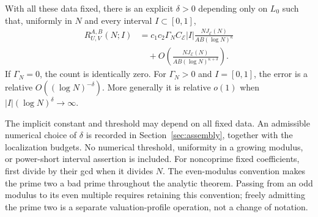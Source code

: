 \begin{theorem}\label{thm:general}
With all these data fixed, there is an explicit \(\delta>0\)
depending only on \(L_0\) such that, uniformly in \(N\) and every interval
\(I\subset[0,1]\),
\begin{align*}
 R_{U,V}^{A,B}(N;I)
 &=c_1c_2\Gamma_N C_{\mathcal E}|I|
       \frac{NJ_{\mathcal E}(N)}{AB(\log N)^\kappa}\\
 &\quad+O\left(\frac{NJ_{\mathcal E}(N)}
                         {AB(\log N)^{\kappa+\delta}}\right).
\end{align*}
If \(\Gamma_N=0\), the count is identically zero.
For \(\Gamma_N>0\) and \(I=[0,1]\), the error is a relative
\(O((\log N)^{-\delta})\). More generally it is relative \(o(1)\)
when \(|I|(\log N)^\delta\to\infty\).
\end{theorem}

The implicit constant and threshold may depend on all fixed data.
An admissible numerical choice of \(\delta\) is recorded in
Section~\ref{sec:assembly}, together with the localization budgets.
No numerical threshold, uniformity in a growing modulus, or
power-short interval assertion is included. For noncoprime fixed
coefficients, first divide by their gcd when it divides \(N\).
The even-modulus convention makes the prime two a bad prime throughout
the analytic theorem. Passing from an odd modulus to its even multiple
requires retaining this convention; freely admitting the prime two is
a separate valuation-profile operation, not a change of notation.

